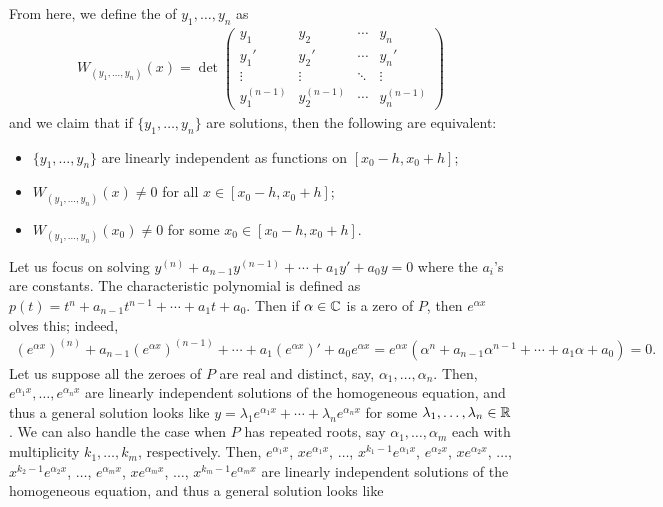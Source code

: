 From here, we define the  of $y_{1},\ldots,y_{n}$ as
\begin{align}
    W_{(y_{1},\ldots,y_{n})}(x) = \det\begin{pmatrix}
        y_{1} & y_{2} & \cdots & y_{n} \\
        y_{1}' & y_{2}' & \cdots & y_{n}' \\
        \vdots & \vdots & \ddots & \vdots \\
        y_{1}^{(n-1)} & y_{2}^{(n-1)} & \cdots & y_{n}^{(n-1)}
    \end{pmatrix}
\end{align}
and we claim that if $\{y_{1},\ldots,y_{n}\}$ are solutions, then the following are equivalent:
\begin{itemize}
    \item $\{y_{1},\ldots,y_{n}\}$ are linearly independent as functions on $[x_{0}-h,x_{0}+h]$;
    \item $W_{(y_{1},\ldots,y_{n})}(x) \neq 0$ for all $x \in [x_{0}-h,x_{0}+h]$;
    \item $W_{(y_{1},\ldots,y_{n})}(x_{0}) \neq 0$ for some $x_{0} \in [x_{0}-h,x_{0}+h]$.
\end{itemize}
Let us focus on solving $y^{(n)}+a_{n-1}y^{(n-1)}+\cdots+a_{1}y'+a_{0}y=0$ where the $a_{i}$'s are constants. The characteristic polynomial is defined as $p(t) = t^{n} + a_{n-1} t^{n-1} + \cdots + a_{1} t + a_{0}$. Then if $\alpha \in \mathbb{C}$ is a zero of $P$, then $e^{\alpha x}$ olves this; indeed, \begin{align}
    (e^{\alpha x})^{(n)} + a_{n-1} (e^{\alpha x})^{(n-1)} + \cdots + a_{1} (e^{\alpha x})' + a_{0} e^{\alpha x} = e^{\alpha x} (\alpha^{n} + a_{n-1} \alpha^{n-1} + \cdots + a_{1} \alpha + a_{0}) = 0.
\end{align}
Let us suppose all the zeroes of $P$ are real and distinct, say, $\alpha_{1},\ldots,\alpha_{n}$. Then, $e^{\alpha_{1} x},\ldots,e^{\alpha_{n} x}$ are linearly independent solutions of the homogeneous equation, and thus a general solution looks like $y = \lambda_{1} e^{\alpha_{1} x} + \cdots + \lambda_{n} e^{\alpha_{n} x}$ for some $\lambda_{1},\ldots,\lambda_{n} \in \mathbb{R}$. We can also handle the case when $P$ has repeated roots, say $\alpha_{1},\ldots,\alpha_{m}$ each with multiplicity $k_{1},\ldots,k_{m}$, respectively. Then, $e^{\alpha_{1} x}$, $x e^{\alpha_{1} x}$, $\ldots$, $x^{k_{1}-1} e^{\alpha_{1} x}$, $e^{\alpha_{2} x}$, $x e^{\alpha_{2} x}$, $\ldots$, $x^{k_{2}-1} e^{\alpha_{2} x}$, $\ldots$, $e^{\alpha_{m} x}$, $x e^{\alpha_{m} x}$, $\ldots$, $x^{k_{m}-1} e^{\alpha_{m} x}$ are linearly independent solutions of the homogeneous equation, and thus a general solution looks like
